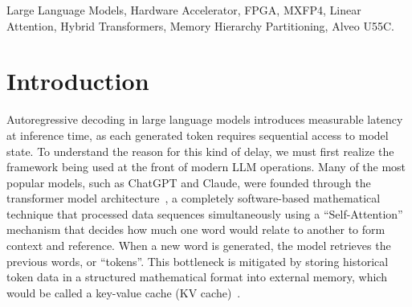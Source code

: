 ﻿\documentclass[conference]{IEEEtran}
\begin{document}
\begin{abstract}
Advances in large language models have caused major bottlenecks due to the substantial computation and storage needs required to process long strings of input data as well as the storage needed for all internal key value representations. The key-value (KV) cache for a traditional Transformer model scales linearly with sequence length. Hybrid methods were proposed that combine both linear and full-attention layers within one neural network architecture. However, even with these hybrid architectures, the use of either high precision floating point numbers, such as 32-bit single-precision floating-point (FP32), or standard low precision floating point numbers (e.g., FP8) quickly exhausts available on-chip memory. We propose a novel architecture that uses a native 4-bit Open Compute Project (OCP) Microscaling (MXFP4) datapath that reduces the amount of space required to store fixed-size linear state matrices. Testing of our proposed MXFP4 architecture was done on an AMD Alveo U55C FPGA field-programmable gate array (FPGA). The results from our evaluation indicated that the MXFP4-based implementation achieved a 5.537$\times$ speedup and a 216.011$\times$ improvement in energy efficiency relative to the H100 baseline, as well as an 86.719\% reduction in recurrent-state storage relative to FP32.
\end{abstract}


\begin{IEEEkeywords}
Large Language Models, Hardware Accelerator, FPGA, MXFP4, Linear Attention, Hybrid Transformers, Memory Hierarchy Partitioning, Alveo U55C.
\end{IEEEkeywords}

\section{Introduction}
Autoregressive decoding in large language models introduces measurable latency at inference time, as each generated token requires sequential access to model state. To understand the reason for this kind of delay, we must first realize the framework being used at the front of modern LLM operations. Many of the most popular models, such as ChatGPT and Claude, were founded through the transformer model architecture~\cite{b2}, a completely software-based mathematical technique that processed data sequences simultaneously using a ``Self-Attention'' mechanism that decides how much one word would relate to another to form context and reference. When a new word is generated, the model retrieves the previous words, or ``tokens''. This bottleneck is mitigated by storing historical token data in a structured mathematical format into external memory, which would be called a key-value cache (KV cache)~\cite{b6}.
\end{document}
